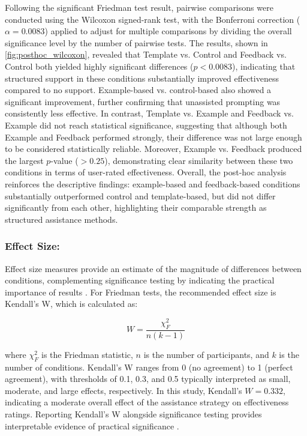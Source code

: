 Following the significant Friedman test result, pairwise comparisons were conducted using the Wilcoxon signed-rank test, with the Bonferroni correction ($\alpha = 0.0083$) applied to adjust for multiple comparisons by dividing the overall significance level by the number of pairwise tests. The results, shown in \autoref{fig:posthoc_wilcoxon}, revealed that Template vs. Control and Feedback vs. Control both yielded highly significant differences ($p < 0.0083$), indicating that structured support in these conditions substantially improved effectiveness compared to no support. Example-based vs. control-based also showed a significant improvement, further confirming that unassisted prompting was consistently less effective. In contrast, Template vs. Example and Feedback vs. Example did not reach statistical significance, suggesting that although both Example and Feedback performed strongly, their difference was not large enough to be considered statistically reliable. Moreover, Example vs. Feedback produced the largest $p$-value ($> 0.25$), demonstrating clear similarity between these two conditions in terms of user-rated effectiveness. Overall, the post-hoc analysis reinforces the descriptive findings: example-based and feedback-based conditions substantially outperformed control and template-based, but did not differ significantly from each other, highlighting their comparable strength as structured assistance methods.

\subsubsection{Effect Size:}

Effect size measures provide an estimate of the magnitude of differences between conditions, complementing significance testing by indicating the practical importance of results \cite{in2024alternatives}. For Friedman tests, the recommended effect size is Kendall's W, which is calculated as:

\begin{equation}
W = \frac{\chi^2_{F}}{n (k-1)}
\end{equation}

where $\chi^2_{F}$ is the Friedman statistic, $n$ is the number of participants, and $k$ is the number of conditions. Kendall's W ranges from 0 (no agreement) to 1 (perfect agreement), with thresholds of 0.1, 0.3, and 0.5 typically interpreted as small, moderate, and large effects, respectively. In this study, Kendall's $W = 0.332$, indicating a moderate overall effect of the assistance strategy on effectiveness ratings. Reporting Kendall's W alongside significance testing provides interpretable evidence of practical significance \cite{in2024alternatives,tomczak2022need}.

